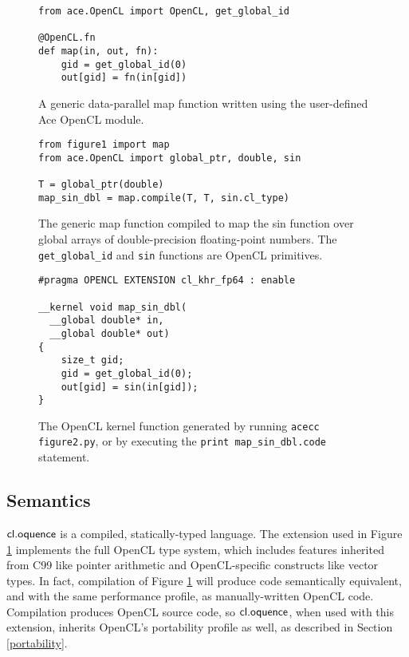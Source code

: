 \documentclass[10pt, conference, compsocconf]{IEEEtran}
\begin{document}
\begin{figure}
\small{
\begin{verbatim}
from ace.OpenCL import OpenCL, get_global_id

@OpenCL.fn
def map(in, out, fn):
    gid = get_global_id(0)
    out[gid] = fn(in[gid])
\end{verbatim}
}
\vspace{-10pt}
\caption{A generic data-parallel map function written using the user-defined Ace OpenCL module.}
\label{map}
\end{figure}
\begin{figure}
\small{
\begin{verbatim}
from figure1 import map
from ace.OpenCL import global_ptr, double, sin
    
T = global_ptr(double)
map_sin_dbl = map.compile(T, T, sin.cl_type)
\end{verbatim}
}
\vspace{-10pt}
\caption{The generic map function compiled to map the sin function over global arrays of double-precision floating-point numbers. The \texttt{get\_global\_id} and \texttt{sin} functions are OpenCL primitives.}
\label{mapsindblace}
\end{figure}
\begin{figure}
\small{\begin{verbatim}
#pragma OPENCL EXTENSION cl_khr_fp64 : enable

__kernel void map_sin_dbl(
  __global double* in, 
  __global double* out) 
{
    size_t gid;
    gid = get_global_id(0);
    out[gid] = sin(in[gid]);
}\end{verbatim}
}
\vspace{-10pt}
\caption{The OpenCL kernel function generated by running \texttt{acecc figure2.py}, or by executing the  \texttt{print map\_sin\_dbl.code} statement.}
\label{mapsinint}
\vspace{-10pt}
\end{figure}

\subsection{Semantics}
$\textsf{cl.oquence}$ is a compiled, statically-typed language. The extension used in Figure \ref{map} implements the full OpenCL type system, which includes features inherited from C99 like pointer arithmetic and OpenCL-specific constructs like vector types. In fact, compilation of Figure \ref{map} will produce code semantically equivalent, and with the same performance profile, as manually-written OpenCL code. Compilation produces OpenCL source code, so $\textsf{cl.oquence}$, when used with this extension, inherits OpenCL's portability profile as well, as described in Section \ref{portability}.
\end{document}
